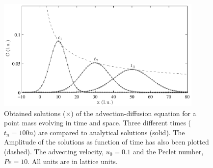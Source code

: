 \begin{figure}
\begin{center}
\includegraphics[width=0.9\textwidth]{fig/adv_dif_10_30_50.pdf}
\end{center}
\caption{Obtained solutions ($\times$) of the
  advection-diffusion equation for a point mass evolving in time and
  space. Three different times ($t_n = 100n$) are compared to
  analytical solutions (solid). The Amplitude of the solutions as
  function of time has also been plotted (dashed). The advecting
  velocity, $u_0 = 0.1$ and the Peclet number, $Pe = 10$.  All units
  are in lattice units.}
\label{fig:adv-dif}
\end{figure}
